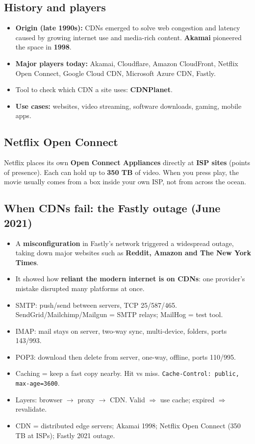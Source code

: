 \subsection{History and players}
\begin{itemize}
  \item \textbf{Origin (late 1990s):} CDNs emerged to solve web congestion and latency caused by growing internet use and media-rich content. \textbf{Akamai} pioneered the space in \textbf{1998}.
  \item \textbf{Major players today:} Akamai, Cloudflare, Amazon CloudFront, Netflix Open Connect, Google Cloud CDN, Microsoft Azure CDN, Fastly.
  \item Tool to check which CDN a site uses: \textbf{CDNPlanet}.
  \item \textbf{Use cases:} websites, video streaming, software downloads, gaming, mobile apps.
\end{itemize}

\subsection{Netflix Open Connect}
Netflix places its own \textbf{Open Connect Appliances} directly at \textbf{ISP sites} (points of presence). Each can hold up to \textbf{350 TB} of video. When you press play, the movie usually comes from a box inside your own ISP, not from across the ocean.

\subsection{When CDNs fail: the Fastly outage (June 2021)}
\begin{itemize}
  \item A \textbf{misconfiguration} in Fastly's network triggered a widespread outage, taking down major websites such as \textbf{Reddit, Amazon and The New York Times}.
  \item It showed how \textbf{reliant the modern internet is on CDNs}: one provider's mistake disrupted many platforms at once.
\end{itemize}

\begin{recap}
\begin{itemize}
  \item SMTP: push/send between servers, TCP 25/587/465. SendGrid/Mailchimp/Mailgun = SMTP relays; MailHog = test tool.
  \item IMAP: mail stays on server, two-way sync, multi-device, folders, ports 143/993.
  \item POP3: download then delete from server, one-way, offline, ports 110/995.
  \item Caching = keep a fast copy nearby. Hit vs miss. \texttt{Cache-Control: public, max-age=3600}.
  \item Layers: browser $\to$ proxy $\to$ CDN. Valid $\Rightarrow$ use cache; expired $\Rightarrow$ revalidate.
  \item CDN = distributed edge servers; Akamai 1998; Netflix Open Connect (350 TB at ISPs); Fastly 2021 outage.
\end{itemize}
\end{recap}
